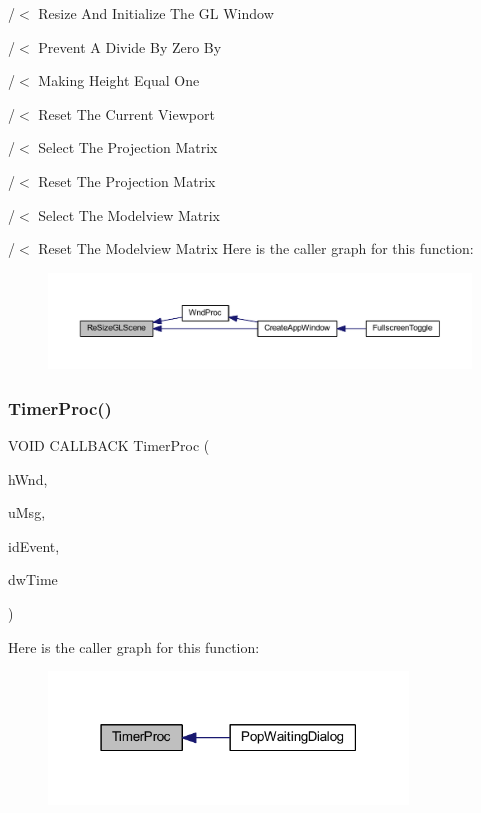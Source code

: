 /$<$ Resize And Initialize The GL Window 

/$<$ Prevent A Divide By Zero By

/$<$ Making Height Equal One

/$<$ Reset The Current Viewport

/$<$ Select The Projection Matrix

/$<$ Reset The Projection Matrix

/$<$ Select The Modelview Matrix

/$<$ Reset The Modelview Matrix Here is the caller graph for this function\+:\nopagebreak
\begin{figure}[H]
\begin{center}
\leavevmode
\includegraphics[width=350pt]{supportcode_8cpp_a87bb84d489df61ed7b0c002584fd984f_icgraph}
\end{center}
\end{figure}
\mbox{\label{supportcode_8cpp_a07f77ba099d001c473f6748492e16dc5}} 
\subsubsection{Timer\+Proc()}
{\footnotesize\ttfamily V\+O\+ID C\+A\+L\+L\+B\+A\+CK Timer\+Proc (\begin{DoxyParamCaption}\item[{H\+W\+ND}]{h\+Wnd,  }\item[{U\+I\+NT}]{u\+Msg,  }\item[{U\+I\+NT}]{id\+Event,  }\item[{D\+W\+O\+RD}]{dw\+Time }\end{DoxyParamCaption})}

Here is the caller graph for this function\+:\nopagebreak
\begin{figure}[H]
\begin{center}
\leavevmode
\includegraphics[width=271pt]{supportcode_8cpp_a07f77ba099d001c473f6748492e16dc5_icgraph}
\end{center}
\end{figure}
\mbox{\label{supportcode_8cpp_a661c2abc03926acfaeb93b4ae7db4943}} 
